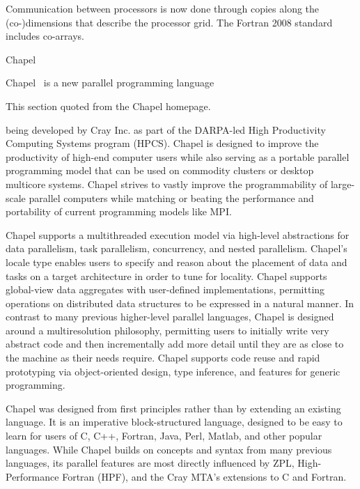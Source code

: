Communication between processors is now done through copies along the
(co-)dimensions that describe the processor grid.
The Fortran 2008 standard includes co-arrays.


 {Chapel}
\label{sec:Chapel}

Chapel~\cite{Chapel:homepage} is a new parallel programming
language
\begin{footnoteenv}
  {This section quoted from the Chapel homepage.}
\end{footnoteenv}
being developed by Cray Inc. as part of the DARPA-led High
Productivity Computing Systems program (HPCS). Chapel is designed to
improve the productivity of high-end computer users while also serving
as a portable parallel programming model that can be used on commodity
clusters or desktop multicore systems. Chapel strives to vastly
improve the programmability of large-scale parallel computers while
matching or beating the performance and portability of current
programming models like MPI.

Chapel supports a multithreaded execution model via high-level
abstractions for data parallelism, task parallelism, concurrency, and
nested parallelism. Chapel's locale type enables users to specify and
reason about the placement of data and tasks on a target architecture
in order to tune for locality. Chapel supports global-view data
aggregates with user-defined implementations, permitting operations on
distributed data structures to be expressed in a natural manner. In
contrast to many previous higher-level parallel languages, Chapel is
designed around a multiresolution philosophy, permitting users to
initially write very abstract code and then incrementally add more
detail until they are as close to the machine as their needs
require. Chapel supports code reuse and rapid prototyping via
object-oriented design, type inference, and features for generic
programming.

Chapel was designed from first principles rather than by extending an
existing language. It is an imperative block-structured language,
designed to be easy to learn for users of C, C++, Fortran, Java, Perl,
Matlab, and other popular languages. While Chapel builds on concepts
and syntax from many previous languages, its parallel features are
most directly influenced by ZPL, High-Performance Fortran (HPF), and
the Cray MTA's extensions to C and Fortran.

